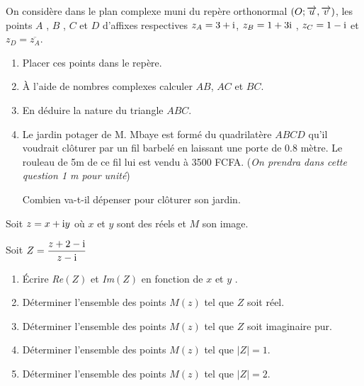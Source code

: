 \begin{exercice}
 On considère dans le plan complexe muni du repère orthonormal $ (O ;\overrightarrow{u},\overrightarrow{v}) $, les points $A $ , $ B$ , $ C $  et $ D $ d'affixes respectives $ z_A=3+\text{i} $,\;  $z_B=1+3\text{i} $ \; , \;  $ z_C=1- \text{i} $ \; et \; $ z_D=\overline{z_A} $.
 \begin{enumerate}
  \item Placer ces points dans le repère.
  \item À l'aide de nombres complexes calculer \; $ AB$, $AC  $ et $ BC$.

   \item En déduire la nature  du triangle $ ABC. $ 
   \item Le jardin potager de M. Mbaye  est formé du quadrilatère $ ABCD $ qu'il voudrait clôturer  par un fil barbelé en laissant une porte de $ 0.8 $ mètre. Le rouleau de 5m de
ce fil lui est vendu à 3500 FCFA. (\textit{On prendra dans cette question 1 m pour unité})


 Combien va-t-il dépenser pour clôturer son jardin. 

  
\end{enumerate}
\end{exercice}
\begin{exercice}
Soit $ z=x+\text{i} y $ où $x $ et $y $ sont des réels et $ M $ son image.

Soit  $ Z=\dfrac{z+2-\text{i}}{z-\text{i}} $
 
 \begin{enumerate}
\item Écrire \textit{Re}$ (Z) $  et \textit{Im}$(Z) $ en fonction de $x $ et $y $ .
\item Déterminer l'ensemble des points $ M(z) $ tel que  $ Z $ soit réel.
\item Déterminer l'ensemble des points $ M(z) $ tel que  $ Z $ soit imaginaire pur.
\item Déterminer l'ensemble des points $ M(z) $ tel que  $ |Z|=1$.
\item Déterminer l'ensemble des points $ M(z) $ tel que  $ |Z|=2$.
\end{enumerate}
\end{exercice}
